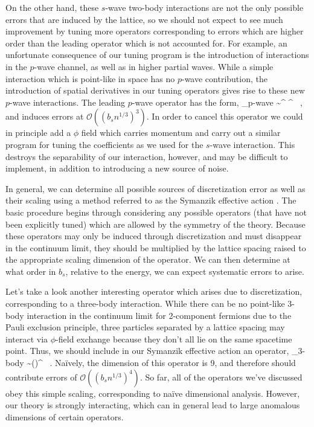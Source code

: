 On the other hand, these $s$-wave two-body interactions are not the only possible errors that are induced by the lattice, so we should not expect to see much improvement by tuning more operators corresponding to errors which are higher order than the leading operator which is not accounted for. For example, an unfortunate consequence of our tuning program is the introduction of interactions in the $p$-wave channel, as well as in higher partial waves. While a simple interaction which is point-like in space has no $p$-wave contribution, the introduction of spatial derivatives in our tuning operators gives rise to these new $p$-wave interactions. The leading $p$-wave operator has the form,
\beq
{}_{p\mbox{\tiny -wave}} \sim \psi^{\dagger} \mathbf{\nabla} \psi \cdot \psi^{\dagger} \mathbf{\nabla} \psi \ ,
\eeq
and induces errors at ${\mathcal{ O}}\left((b_s n^{1/3})^{3}\right)$. In order to cancel this operator we could in principle add a $\phi$ field which carries momentum and carry out a similar program for tuning the coefficients as we used for the $s$-wave interaction. This destroys the separability of our interaction, however, and may be difficult to implement, in addition to introducing a new source of noise.

In general, we can determine all possible sources of discretization error as well as their scaling using a method referred to as the Symanzik effective action \cite{Symanzik1,Symanzik2,Symanzik3,Symanzik4,EKLN4}. The basic procedure begins through considering any possible operators (that have not been explicitly tuned) which are allowed by the symmetry of the theory. Because these operators may only be induced through discretization and must disappear in the continuum limit, they should be multiplied by the lattice spacing raised to the appropriate scaling dimension of the operator. We can then determine at what order in $b_s$, relative to the energy, we can expect systematic errors to arise.

Let's take a look another interesting operator which arises due to discretization, corresponding to a three-body interaction. While there can be no point-like 3-body interaction in the continuum limit for 2-component fermions due to the Pauli exclusion principle, three particles separated by a lattice spacing may interact via $\phi$-field exchange because they don't all lie on the same spacetime point. Thus, we should include in our Symanzik effective action an operator,
\beq
{}_{\mbox{\tiny 3-body}} \sim \left(\psi \psi \psi \right)^{\dagger} \psi \psi \psi \ .
\eeq
Na\"ively, the dimension of this operator is 9, and therefore should contribute errors of ${\mathcal{ O}}\left((b_sn^{1/3})^4\right)$. So far, all of the operators we've discussed obey this simple scaling, corresponding to na\"ive dimensional analysis. However, our theory is strongly interacting, which can in general lead to large anomalous dimensions of certain operators. 

